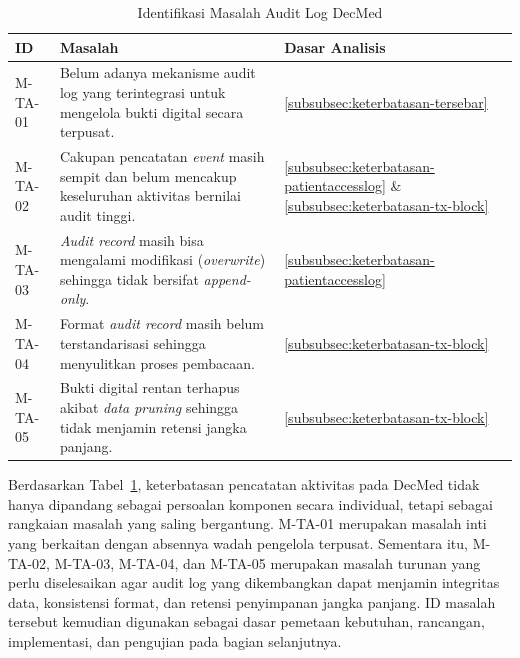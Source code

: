 \begin{table}[htbp]
    \centering
    \caption{Identifikasi Masalah Audit Log DecMed}
    \label{tab:identifikasi-masalah}
    \renewcommand{\arraystretch}{1.3}
    \begin{tabular}{|p{2cm}|p{7.5cm}|p{4cm}|}
        \hline
        \textbf{ID} & \textbf{Masalah} & \textbf{Dasar Analisis} \\
        \hline
        M-TA-01 & Belum adanya mekanisme audit log yang terintegrasi untuk mengelola bukti digital secara terpusat. & \ref{subsubsec:keterbatasan-tersebar} \\
        \hline
        M-TA-02 & Cakupan pencatatan \textit{event} masih sempit dan belum mencakup keseluruhan aktivitas bernilai audit tinggi. & \ref{subsubsec:keterbatasan-patientaccesslog} \& \ref{subsubsec:keterbatasan-tx-block} \\
        \hline
        M-TA-03 & \textit{Audit record} masih bisa mengalami modifikasi (\textit{overwrite}) sehingga tidak bersifat \textit{append-only}. & \ref{subsubsec:keterbatasan-patientaccesslog} \\
        \hline
        M-TA-04 & Format \textit{audit record} masih belum terstandarisasi sehingga menyulitkan proses pembacaan. & \ref{subsubsec:keterbatasan-tx-block} \\
        \hline
        M-TA-05 & Bukti digital rentan terhapus akibat \textit{data pruning} sehingga tidak menjamin retensi jangka panjang. & \ref{subsubsec:keterbatasan-tx-block} \\
        \hline
    \end{tabular}
\end{table}

Berdasarkan Tabel~\ref{tab:identifikasi-masalah}, keterbatasan pencatatan aktivitas pada DecMed tidak hanya dipandang sebagai persoalan komponen secara individual, tetapi sebagai rangkaian masalah yang saling bergantung. M-TA-01 merupakan masalah inti yang berkaitan dengan absennya wadah pengelola terpusat. Sementara itu, M-TA-02, M-TA-03, M-TA-04, dan M-TA-05 merupakan masalah turunan yang perlu diselesaikan agar audit log yang dikembangkan dapat menjamin integritas data, konsistensi format, dan retensi penyimpanan jangka panjang. ID masalah tersebut kemudian digunakan sebagai dasar pemetaan kebutuhan, rancangan, implementasi, dan pengujian pada bagian selanjutnya.